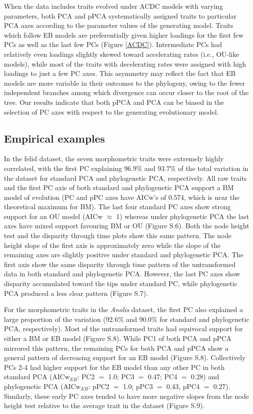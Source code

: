 \documentclass[a4paper,11pt]{article}
\begin{document}
When the data includes traits evolved under ACDC models with varying parameters, both PCA and pPCA systematically assigned traits to particular PCA axes according to the parameter values of the generating model. Traits which follow EB models are preferentially given higher loadings for the first few PCs as well as the last few PCs (Figure \ref{ACDC}). Intermediate PCs had relatively even loadings slightly skewed toward accelerating rates (i.e., OU-like models), while most of the traits with decelerating rates were assigned with high loadings to just a few PC axes. This asymmetry may reflect the fact that EB models are more variable in their outcomes to the phylogeny, owing to the fewer independent branches among which divergence can occur closer to the root of the tree. Our results indicate that both pPCA and PCA can be biased in the selection of PC axes with respect to the generating evolutionary model.

\subsection{Empirical examples}
In the felid dataset, the seven morphometric traits were extremely highly correlated, with the first PC explaining 96.9\% and 93.7\% of the total variation in the dataset for standard PCA and phylogenetic PCA, respectively. All raw traits and the first PC axis of both standard and phylogenetic PCA support a BM model of evolution (PC and pPC axes have AICw's of 0.574, which is near the theoretical maximum for BM). The last four standard PC axes show strong support for an OU model (AICw $\approx$ 1) whereas under phylogenetic PCA the last axes have mixed support favouring BM or OU (Figure S.6). Both the node height test and the disparity through time plots show this same pattern. The node height slope of the first axis is approximately zero while the slope of the remaining axes are slightly positive under standard and phylogenetic PCA. The first axis show the same disparity through time pattern of the untransformed data in both standard and phylogenetic PCA. However, the last PC axes show disparity accumulated toward the tips under standard PC, while phylogenetic PCA produced a less clear pattern (Figure S.7).

For the morphometric traits in the \textit{Anolis} dataset, the first PC also explained a large proportion of the variation (92.6\% and 90.0\% for standard and phylogenetic PCA, respectively). Most of the untransformed traits had equivocal support for either a BM or EB model (Figure S.8). While PC1 of both PCA and pPCA mirrored this pattern, the remaining PCs for both PCA and pPCA show a general pattern of decreasing support for an EB model (Figure S.8). Collectively PCs 2-4 had higher support for the EB model than any other PC in both standard PCA ($\text{AICw}_{EB}$: PC2 $=$ 1.0; PC3 $=$ 0.47; PC4 $=$ 0.28) and phylogenetic PCA ($\text{AICw}_{EB}$: pPC2 $=$ 1.0; pPC3 $=$ 0.43, pPC4 $=$ 0.27).  Similarly, these early PC axes tended to have more negative slopes from the node height test relative to the average trait in the dataset (Figure S.9).
\end{document}
